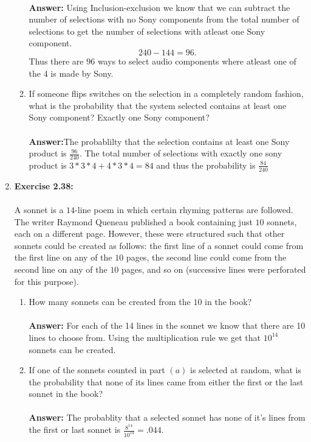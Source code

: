 \documentclass[12pt]{article}
\theoremstyle{homework}
\begin{document}
\begin{enumerate}
\begin{enumerate}
\\
 \textbf{Answer:} Using Inclusion-exclusion we know that we can subtract the number of selections with no Sony components from the total number of selections to get the number of selections with atleast one Sony component.
 \begin{equation*}
  240 - 144 = 96.
\end{equation*}
Thus there are $96$ ways to select audio components where atleast one of the 4 is made by Sony.
 \\
\item If someone flips switches on the selection in a completely random fashion, what is the probability that the system selected contains at least one Sony component? Exactly one Sony component?\\
\\
 \textbf{Answer:}The probablilty that the selection contains at least one Sony product is $\frac{96}{240}$. The total number of selections with exactly one sony product is $3*3*4+4*3*4 = 84$ and thus the probability is $\frac{84}{240}$
 \\
\end{enumerate}
\vspace{1in}


\item\hspace{.5in}\textbf{Exercise 2.38:} \\
\\
A sonnet is a $14$-line poem in which certain rhyming patterns are followed. The writer Raymond Queneau published a book containing just $10$ sonnets, each on a different page. However, these were structured such that other sonnets could be created as follows: the first line of a sonnet could come from the first line on any of the $10$ pages, the second line could come from the second line on any of the $10$ pages, and so on (successive lines were perforated for this purpose).
\begin{enumerate}
\item How many sonnets can be created from the $10$ in the book?\\
\\
 \textbf{Answer:} For each of the 14 lines in the sonnet we know that there are 10 lines to choose from. Using the multiplication rule we get that $10^{14}$ sonnets can be created. 
 \\
\item If one of the sonnets counted in part $(a)$ is selected at random, what is the probability that none of its lines came from either the first or the last sonnet in the book?\\
\\
 \textbf{Answer:} The probablity that a selected sonnet has none of it's lines from the first or last sonnet is $\frac{8^{14}}{10^{14}} = .044$.
 \\
\end{enumerate}
\vspace{1in}



\end{enumerate}
\end{document}

